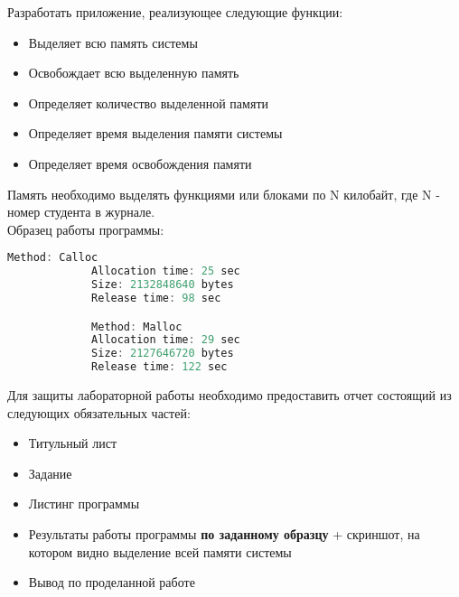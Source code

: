 \documentclass[a4paper,12pt]{article}
\begin{document}

    \begin{flushleft}
        Разработать приложение, реализующее следующие функции:
        \begin{itemize}
            \item Выделяет всю память системы
            \item Освобождает всю выделенную память
            \item Определяет количество выделенной памяти
            \item Определяет время выделения памяти системы
            \item Определяет время освобождения памяти
        \end{itemize}
    \end{flushleft}
  
    Память необходимо выделять функциями  или  блоками по N килобайт, где N - номер студента в журнале. \\

    Образец работы программы:
    \begin{flushleft}
        \begin{lstlisting}[language=c, 
                           breaklines=true, 
                           showtabs=false, 
                           showspaces=false, 
                           showstringspaces=false,
                           basicstyle=\ttfamily \footnotesize]
             Method: Calloc 
             Allocation time: 25 sec 
             Size: 2132848640 bytes 
             Release time: 98 sec

             Method: Malloc 
             Allocation time: 29 sec 
             Size: 2127646720 bytes 
             Release time: 122 sec
        \end{lstlisting}
    \end{flushleft}

    Для защиты лабораторной работы необходимо предоставить отчет состоящий из следующих обязательных частей:
    \begin{itemize}
        \item Титульный лист
        \item Задание
        \item Листинг программы
        \item Результаты работы программы \textbf{по заданному образцу} + скриншот, на котором видно выделение всей памяти системы
        \item Вывод по проделанной работе
    \end{itemize}
  
\end{document}
